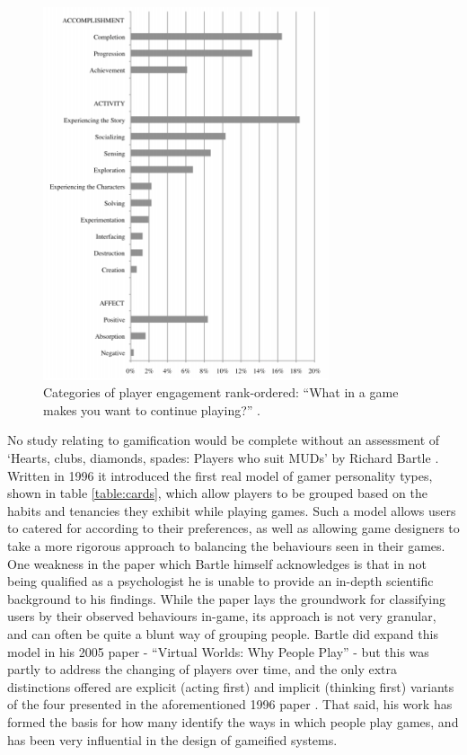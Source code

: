 \documentclass[12pt,a4paper,twoside]{report}
\begin{document}
\begin{figure}
\begin{center}
	\includegraphics[width=0.75\textwidth]{../img/fog.png}
	\caption{Categories of player engagement rank-ordered: ``What in a game makes you want to continue playing?'' \cite{schoenau2011player}.}
	\label{fog}
\end{center}
\end{figure}

No study relating to gamification would be complete without an assessment of `Hearts, clubs, diamonds, spades: Players who suit MUDs' by Richard Bartle \cite{bartle1996hearts}. Written in 1996 it introduced the first real model of gamer personality types, shown in table \ref{table:cards}, which allow players to be grouped based on the habits and tenancies they exhibit while playing games. Such a model allows users to catered for according to their preferences, as well as allowing game designers to take a more rigorous approach to balancing the behaviours seen in their games.  One weakness in the paper which Bartle himself acknowledges is that in not being qualified as a psychologist he is unable to provide an in-depth scientific background to his findings. While the paper lays the groundwork for classifying users by their observed behaviours in-game, its approach is not very granular, and can often be quite a blunt way of grouping people. Bartle did expand this model in his 2005 paper - ``Virtual Worlds: Why People Play'' \cite{bartle2005play} - but this was partly to address the changing of players over time, and the only extra distinctions offered are explicit (acting first) and implicit (thinking first) variants of the four presented in the aforementioned 1996 paper \cite{bartle2005play}. That said, his work has formed the basis for how many identify the ways in which people play games, and has been very influential in the design of gameified systems.
\end{document}
